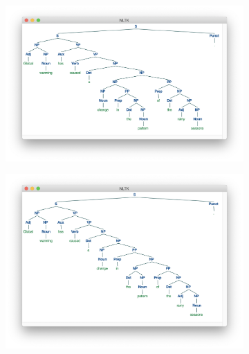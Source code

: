 \documentclass[11pt]{article} %
\begin{document}
\begin{figure}[p]
  \centering
  \begin{subfigure}{0.45\textwidth}
    \includegraphics[width=0.9\linewidth]{images/figure_cfg_tree_1.png}
    \caption{}
  \end{subfigure}
  \begin{subfigure}{0.45\textwidth}
    \includegraphics[width=0.9\linewidth]{images/figure_cfg_tree_2.png}
    \caption{}
  \end{subfigure}


\end{figure}
\end{document}
